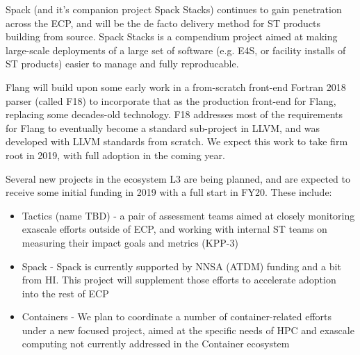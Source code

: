 Spack (and it's companion project Spack Stacks) continues to gain penetration across the ECP, and will be the de facto delivery method for ST products building from source. Spack Stacks is a compendium project aimed at making large-scale deployments of a large set of software (e.g. E4S, or facility installs of ST products) easier to manage and fully reproducable.

Flang will build upon some early work in a from-scratch front-end Fortran 2018 parser (called F18) to incorporate that as the production front-end for Flang, replacing some decades-old technology. F18 addresses most of the requirements for Flang to eventually become a standard sub-project in LLVM, and was developed with LLVM standards from scratch. We expect this work to take firm root in 2019, with full adoption in the coming year.

Several new projects in the ecosystem L3 are being planned, and are expected to receive some initial funding in 2019 with a full start in FY20. These include:
\begin{itemize}
 \item Tactics (name TBD) - a pair of assessment teams aimed at closely monitoring exascale efforts outside of ECP, and working with internal ST teams on measuring their impact goals and metrics (KPP-3)
 \item Spack - Spack is currently supported by NNSA (ATDM) funding and a bit from HI. This project will supplement those efforts to accelerate adoption into the rest of ECP
 \item Containers - We plan to coordinate a number of container-related efforts under a new focused project, aimed at the specific needs of HPC and exascale computing not currently addressed in the Container ecosystem
\end{itemize}

